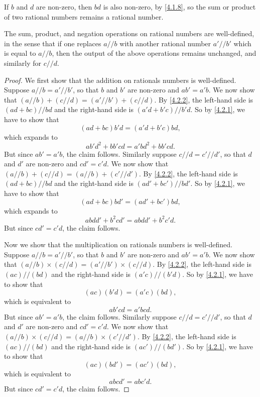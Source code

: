 \begin{note}
  If \(b\) and \(d\) are non-zero, then \(bd\) is also non-zero, by \cref{4.1.8}, so the sum or product of two rational numbers remains a rational number.
\end{note}

\begin{lem}\label{4.2.3}
  The sum, product, and negation operations on rational numbers are well-defined, in the sense that if one replaces \(a // b\) with another rational number \(a' // b'\) which is equal to \(a // b\), then the output of the above operations remains unchanged, and similarly for \(c // d\).
\end{lem}

\begin{proof}
  We first show that the addition on rationals numbers is well-defined.
  Suppose \(a // b = a' // b'\), so that \(b\) and \(b'\) are non-zero and \(ab' = a'b\).
  We now show that \((a // b) + (c // d) = (a' // b') + (c // d)\).
  By \cref{4.2.2}, the left-hand side is \((ad + bc) // bd\) and the right-hand side is \((a'd + b'c) // b'd\).
  So by \cref{4.2.1}, we have to show that
  \[
    (ad + bc)b'd = (a'd + b'c)bd,
  \]
  which expands to
  \[
    ab'd^2 + bb'cd = a'bd^2 + bb'cd.
  \]
  But since \(ab' = a'b\), the claim follows.
  Similarly suppose \(c // d = c' // d'\), so that \(d\) and \(d'\) are non-zero and \(cd' = c'd\).
  We now show that \((a // b) + (c // d) = (a // b) + (c' // d')\).
  By \cref{4.2.2}, the left-hand side is \((ad + bc) // bd\) and the right-hand side is \((ad' + bc') // bd'\).
  So by \cref{4.2.1}, we have to show that
  \[
    (ad + bc)bd' = (ad' + bc')bd,
  \]
  which expands to
  \[
    abdd' + b^2cd' = abdd' + b^2c'd.
  \]
  But since \(cd' = c'd\), the claim follows.

  Now we show that the multiplication on rationals numbers is well-defined.
  Suppose \(a // b = a' // b'\), so that \(b\) and \(b'\) are non-zero and \(ab' = a'b\).
  We now show that \((a // b) \times (c // d) = (a' // b') \times (c // d)\).
  By \cref{4.2.2}, the left-hand side is \((ac) // (bd)\) and the right-hand side is \((a'c) // (b'd)\).
  So by \cref{4.2.1}, we have to show that
  \[
    (ac)(b'd) = (a'c)(bd),
  \]
  which is equivalent to
  \[
    ab'cd = a'bcd.
  \]
  But since \(ab' = a'b\), the claim follows.
  Similarly suppose \(c // d = c' // d'\), so that \(d\) and \(d'\) are non-zero and \(cd' = c'd\).
  We now show that \((a // b) \times (c // d) = (a // b) \times (c' // d')\).
  By \cref{4.2.2}, the left-hand side is \((ac) // (bd)\) and the right-hand side is \((ac') // (bd')\).
  So by \cref{4.2.1}, we have to show that
  \[
    (ac)(bd') = (ac')(bd),
  \]
  which is equivalent to
  \[
    abcd' = abc'd.
  \]
  But since \(cd' = c'd\), the claim follows.


\end{proof}
